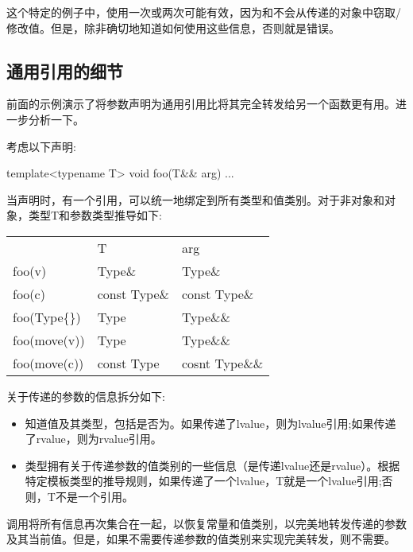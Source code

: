 这个特定的例子中，使用一次或两次可能有效，因为和不会从传递的对象中窃取/修改值。但是，除非确切地知道如何使用这些信息，否则就是错误。

\subsection{通用引用的细节}

前面的示例演示了将参数声明为通用引用比将其完全转发给另一个函数更有用。进一步分析一下。

考虑以下声明:

\begin{cppcode}
template<typename T>
void foo(T&& arg) {
	...
}
\end{cppcode}

当声明时，有一个引用，可以统一地绑定到所有类型和值类别。对于非对象和对象，类型T和参数类型推导如下:

\begin{table}[H]
	\begin{tabular}{lll}
		& T            & arg            \\
		foo(v)        & Type\&       & Type\&         \\
		foo(c)        & const Type\& & const Type\&   \\
		foo(Type\{\}) & Type         & Type\&\&       \\
		foo(move(v))  & Type         & Type\&\&       \\
		foo(move(c))  & const Type   & cosnt Type\&\&
	\end{tabular}
\end{table}

关于传递的参数的信息拆分如下:

\begin{itemize}
	\item {}知道值及其类型，包括是否为。如果传递了lvalue，则为lvalue引用;如果传递了rvalue，则为rvalue引用。
	\item {}类型拥有关于传递参数的值类别的一些信息（是传递lvalue还是rvalue）。根据特定模板类型的推导规则，如果传递了一个lvalue，T就是一个lvalue引用;否则，T不是一个引用。
\end{itemize}

调用将所有信息再次集合在一起，以恢复常量和值类别，以完美地转发传递的参数及其当前值。但是，如果不需要传递参数的值类别来实现完美转发，则不需要。

